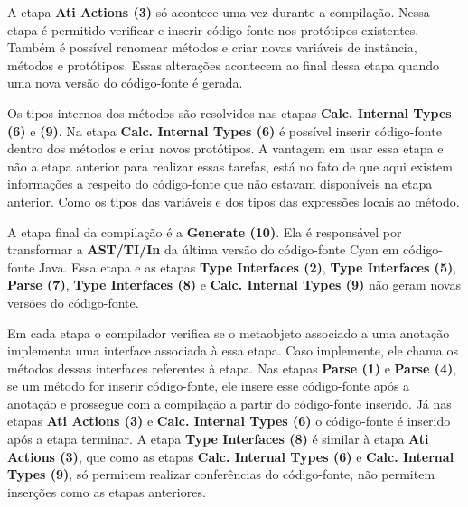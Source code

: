 A etapa \textbf{Ati Actions (3)} só acontece uma vez durante a compilação. Nessa etapa é permitido verificar e inserir código-fonte nos protótipos existentes. Também é possível renomear métodos e criar novas variáveis de instância, métodos e protótipos. Essas alterações acontecem ao final dessa etapa quando uma nova versão do código-fonte é gerada.

Os tipos internos dos métodos são resolvidos nas etapas \textbf{Calc. Internal Types (6)} e \textbf{(9)}. Na etapa \textbf{Calc. Internal Types (6)} é possível inserir código-fonte dentro dos métodos e criar novos protótipos. A vantagem em usar essa etapa e não a etapa anterior para realizar essas tarefas, está no fato de que aqui existem informações a respeito do código-fonte que não estavam disponíveis na etapa anterior. Como os tipos das variáveis e dos tipos das expressões locais ao método.

A etapa final da compilação é a \textbf{Generate (10)}. Ela é responsável por transformar a \textbf{AST/TI/In} da última versão do código-fonte Cyan em código-fonte Java. Essa etapa e as etapas \textbf{Type Interfaces (2)}, \textbf{Type Interfaces (5)}, \textbf{Parse (7)}, \textbf{Type Interfaces (8)} e \textbf{Calc. Internal Types (9)} não geram novas versões do código-fonte.

Em cada etapa o compilador verifica se o metaobjeto associado a uma anotação implementa uma interface associada à essa etapa. Caso implemente, ele chama os métodos dessas interfaces referentes à etapa. Nas etapas \textbf{Parse (1)} e \textbf{Parse (4)}, se um método for inserir código-fonte, ele insere esse código-fonte após a anotação e prossegue com a compilação a partir do código-fonte inserido. Já nas etapas \textbf{Ati Actions (3)} e \textbf{Calc. Internal Types (6)} o código-fonte é inserido após a etapa terminar. A etapa \textbf{Type Interfaces (8)} é similar à etapa \textbf{Ati Actions (3)}, que como as etapas \textbf{Calc. Internal Types (6)} e \textbf{Calc. Internal Types (9)}, só permitem realizar conferências do código-fonte, não permitem inserções como as etapas anteriores.

